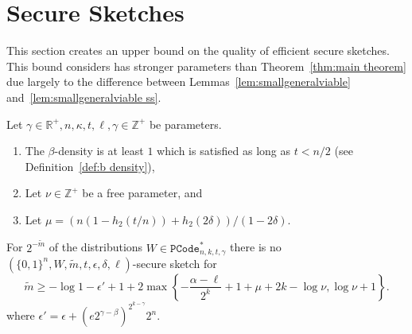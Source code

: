\section{Secure Sketches}
\label{sec:ss}
This section creates an upper bound on the quality of efficient secure sketches.  This bound considers has stronger parameters than Theorem~\ref{thm:main theorem} due largely to the difference between Lemmas~\ref{lem:smallgeneralviable} and~\ref{lem:smallgeneralviable ss}.

\begin{theorem}
Let $\gamma \in\mathbb{R}^+, n, \kappa, t, \ell, \gamma \in\mathbb{Z}^+$ be parameters.
\begin{enumerate}
\itemsep0em
\item The $\beta$-density is at least $1$ which is  satisfied as long as $t< n/2 $ (see Definition~\ref{def:b density}),
\item Let $\nu \in \mathbb{Z}^+$ be a free parameter, and
\item Let $\mu =(n(1-h_2(t/n)) +h_2(2\delta))/(1-2\delta)$.
\end{enumerate}
For $2^{-\tilde{m}}$ of the distributions $W\in \mathtt{PCode}_{n, k, t, \gamma}^{*}$ there is no $(\{0,1\}^n, W, \tilde{m}, t, \epsilon,\delta, \ell)$-secure sketch for 
\[
\tilde{m}\ge  -\log{1-\epsilon'} +1 + 2\max\left\{-\frac{\alpha-\ell}{2^k}+1+\mu+2k-\log{\nu}, \log{\nu+1}\right\}.
\]
where $\epsilon' = \epsilon+\left(e2^{\gamma-\beta}\right)^{2^{k-\gamma}}2^n.$
\label{thm:main theorem ss}
\end{theorem}

